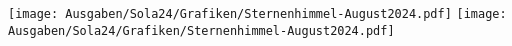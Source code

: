 
\texttt{[image: Ausgaben/Sola24/Grafiken/Sternenhimmel-August2024.pdf]}
\newpage
\texttt{[image: Ausgaben/Sola24/Grafiken/Sternenhimmel-August2024.pdf]}
\newpage